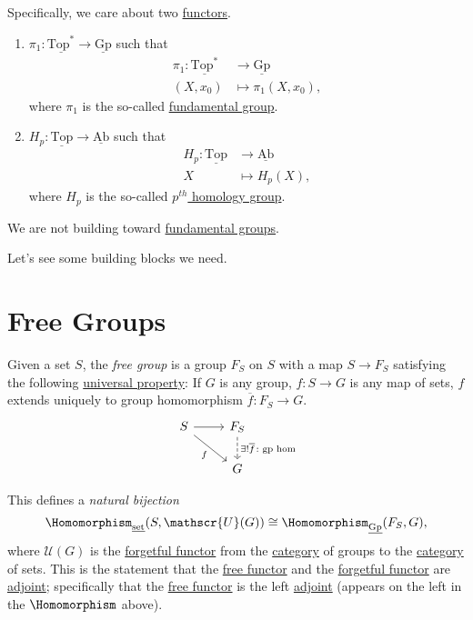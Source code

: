 \begin{remark}
	Specifically, we care about two \hyperref[def:functor]{functors}.
	\begin{enumerate}[(1)]
		\item \(\pi _1\colon \underline{\mathrm{Top}^{\ast}} \to \underline{\mathrm{Gp}}\) such that
		      \[
			      \begin{split}
				      \pi _1\colon \underline{\mathrm{Top}^{\ast}} &\to \underline{\mathrm{Gp}}\\
				      (X, x_0)&\mapsto \pi_1(X, x_0),
			      \end{split}
		      \]
		      where \(\pi _1\) is the so-called \hyperref[def:fundamental-group]{fundamental group}.
		\item \(H_p\colon \underline{\mathrm{Top}} \to \underline{\mathrm{Ab}}\) such that
		      \[
			      \begin{split}
				      H_p\colon \underline{\mathrm{Top}} &\to \underline{\mathrm{Ab}} \\
				      X&\mapsto H_{p} (X),
			      \end{split}
		      \]
		      where \(H_{p}\) is the so-called \hyperref[def:homology-group]{\(p^{th}\) homology group}.
	\end{enumerate}
	We are not building toward \hyperref[def:fundamental-group]{fundamental groups}.
\end{remark}

Let's see some building blocks we need.

\section{Free Groups}
\begin{definition}\label{def:free-group}
	Given a set \(S\), the \emph{free group} is a group \(F_S\) on \(S\) with a map \(S\to F_S\) satisfying the following
	\underline{universal property}: If \(G\) is any group, \(f\colon S\to G\) is any map of sets, \(f\) extends uniquely
	to group homomorphism \(\overline{f} \colon F_S \to G\).
	\[
		\begin{tikzcd}
			S \ar[rd, "f"']\ar[r, ] & F_S\ar[d, dashed, "\exists ! \overline{f} \colon \text{gp hom} "]\\
			& G
		\end{tikzcd}
	\]
\end{definition}
\begin{note}
	This defines a \emph{natural bijection}
	\[
		\Homomorphism_{\underline{\mathrm{set}}}(S, \mathscr{U}(G))\cong \Homomorphism_{\underline{\mathrm{Gp}}}(F_S, G),
	\]
	where \(\mathscr{U} (G)\) is the \hyperref[eg:forgetful-functor]{forgetful functor} from the
	\hyperref[def:category]{category} of groups to the \hyperref[def:category]{category} of sets. This is the
	statement that the \hyperref[eg:free-functor]{free functor} and the \hyperref[eg:forgetful-functor]{forgetful functor} are \hyperref[def:adjoint-functor]{adjoint};
	specifically that the \hyperref[eg:free-functor]{free functor} is the left \hyperref[def:adjoint-functor]{adjoint} (appears on the left in the \(\Homomorphism\) above).
\end{note}

